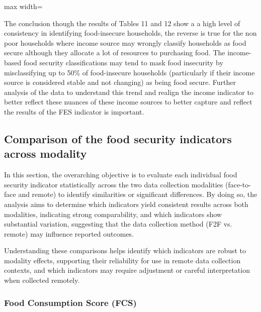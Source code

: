 \documentclass[11pt,harvard]{article}
\begin{document}
	\begin{table}[htbp]
		\centering
		\begin{adjustbox}{max width=\textwidth}
			\begin{threeparttable}
				\caption{Cross Tabulation of Acute Food Insecurity (CAR\_Income vs. CARI\_FES) Remote Sample}
				\scriptsize
				 
				\label{tab:BF_RM_Cross_Tabulation}
			\end{threeparttable}
		\end{adjustbox}
	\end{table}
	
	The conclusion though the results of Tables 11 and 12 show a a high level of consistency in identifying food-insecure households, the reverse is true for the non poor households where income source may wrongly classify households as food secure although they allocate a lot of resources to purchasing food. The income-based food security classifications may tend to mask food insecurity by misclassifying up to 50\% of food-insecure households   (particularly if their income source is considered stable and not changing) as being food secure. Further analysis of the data to understand this trend and realign the income indicator to better reflect these nuances of these income sources to better capture and reflect the results of the FES indicator is important.
		
	\subsection{Comparison of the food security indicators across modality} 
	
	In this section, the overarching objective is to evaluate each individual food security indicator statistically across the two data collection modalities (face-to-face and remote) to identify similarities or significant differences. By doing so, the analysis aims to determine which indicators yield consistent results across both modalities, indicating strong comparability, and which indicators show substantial variation, suggesting that the data collection method (F2F vs. remote) may influence reported outcomes.

	Understanding these comparisons helps identify which indicators are robust to modality effects, supporting their reliability for use in remote data collection contexts, and which indicators may require adjustment or careful interpretation when collected remotely.
	
	\subsubsection{Food Consumption Score (FCS)}
	
\end{document}
